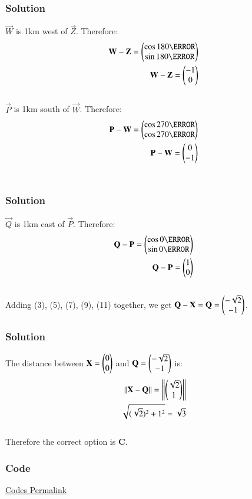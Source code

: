 \documentclass{beamer}
\begin{document}
\begin{frame}[fragile]
    \frametitle{Solution}
$\vec{W}$ is 1km west of $\vec{Z}$. Therefore:\begin{align}
\vec{W}-\vec{Z} = \myvec{\cos180\degree \\ \sin180\degree}\\
\vec{W}-\vec{Z} = \myvec{-1\\0}
\end{align}\\
$\vec{P}$ is 1km south of $\vec{W}$. Therefore:\begin{align}
\vec{P}-\vec{W} = \myvec{\cos270\degree \\  \cos270\degree}\\
\vec{P}-\vec{W} = \myvec{0\\-1}
\end{align}\\
\end{frame}

\begin{frame}[fragile]
    \frametitle{Solution}
$\vec{Q}$ is 1km east of $\vec{P}$. Therefore:\begin{align}
\vec{Q}-\vec{P} = \myvec{\cos0\degree \\ \sin0\degree}\\
\vec{Q}-\vec{P} = \myvec{1\\0}
\end{align}\\
Adding (3), (5), (7), (9), (11) together, we get $\mathbf{Q}-\mathbf{X} =\mathbf{Q} = \begin{pmatrix}-\sqrt{2}\\-1\end{pmatrix}$.
\end{frame}

\begin{frame}[fragile]
    \frametitle{Solution}
The distance between $\mathbf{X}=\begin{pmatrix}0\\0\end{pmatrix}$ and $\mathbf{Q}=\begin{pmatrix}-\sqrt{2}\\-1\end{pmatrix}$ is:
\begin{align}
    ||\mathbf{X} - \mathbf{Q}||= \left\lVert\begin{pmatrix}\sqrt{2}\\1\end{pmatrix}\right\rVert \\
    \sqrt{(\sqrt{2})^2 +1^2} = \sqrt{3}
\end{align}\\
Therefore the correct option is \textbf{C}.
\end{frame}

\begin{frame}[fragile]
    \frametitle{Code}
\href{https://github.com/AdityaAppana/ee1030-2025/tree/96431e23cc4d088e70368e400c3c60fbecfcaaa8/ee25btech11004/matgeo/12.18/Codes}{Codes Permalink}
\end{frame}
\end{document}
